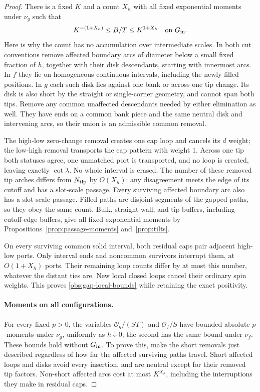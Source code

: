 \begin{proof}
There is a fixed $K$ and a count $X_h$ with all fixed exponential
moments under $\nu_g$ such that
\begin{equation}
 K^{-(1+X_h)}\le B/T\le K^{1+X_h}
       \quad\hbox{on }G_{\rm in}.
 \label{obs:gap-local-bounds}
\end{equation}
Here is why the count has no accumulation over intermediate
scales.  In both cut conventions remove affected boundary arcs
of diameter below a small fixed fraction of $h$, together with
their disk descendants, starting with innermost arcs.  In $f$
they lie on homogeneous continuous intervals, including the
newly filled positions.  In $g$ each such disk lies against one
bank or across one tip change.  Its disk is also short by the
straight or single-corner geometry, and cannot span both tips.
Remove any common unaffected descendants needed by either
elimination as well.  They have ends on a common bank piece
and the same neutral disk and intervening arcs, so their union
is an admissible common removal.

The high-low zero-change removal creates one cap loop and cancels
its $d$ weight; the low-high removal transports the cap pattern
with weight $1$.  Across one tip both statuses agree, one unmatched
port is transported, and no loop is created, leaving exactly
$\cot\lambda$.  No whole interval is erased.  The number of
these removed tip arches differs from $N_{\rm tip}$ by $O(X_h)$:
any disagreement meets the edge of its cutoff and has a slot-scale
passage.  Every surviving affected boundary arc also has a
slot-scale passage.  Filled paths are disjoint segments of the
gapped paths, so they obey the same count.  Bulk, straight-wall,
and tip buffers, including cutoff-edge buffers, give all fixed
exponential moments by Propositions~\ref{prop:passage-moments}
and~\ref{prop:tilts}.

On every surviving common solid interval, both residual caps pair
adjacent high-low ports.  Only interval ends and noncommon survivors
interrupt them, at $O(1+X_h)$ ports.  Their remaining loop counts
differ by at most this number, whatever the distant ties are.
New local closed loops cancel their ordinary spin weights.  This
proves \eqref{obs:gap-local-bounds} while retaining the exact
positivity.

\paragraph{Moments on all configurations.}
For every fixed $p>0$, the variables
$\mathcal O_g/(ST)$ and $\mathcal O_f/S$ have bounded absolute
$p$-moments under $\nu_g$, uniformly as $h\downarrow0$; the
second has the same bound under $\nu_f$.  These bounds hold
without $G_{\rm in}$.  To prove this, make the short removals just
described regardless of how far the affected surviving paths
travel.  Short affected loops and disks avoid every insertion,
and are neutral except for their removed tip factors.  Non-short
affected arcs cost at most $K^{X_h}$, including the interruptions
they make in residual caps.


\end{proof}
